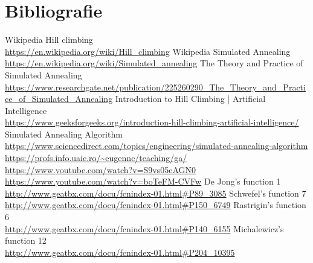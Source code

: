 \documentclass{article}
\begin{document}
\section{Bibliografie}
  Wikipedia Hill climbing
  \\ \url{https://en.wikipedia.org/wiki/Hill_climbing}
  Wikipedia Simulated Annealing
  \\ \url{https://en.wikipedia.org/wiki/Simulated_annealing}
  The Theory and Practice of Simulated Annealing
  \\ \url{https://www.researchgate.net/publication/225260290_The_Theory_and_Practice_of_Simulated_Annealing}
  Introduction to Hill Climbing | Artificial Intelligence
  \\ \url{https://www.geeksforgeeks.org/introduction-hill-climbing-artificial-intelligence/}
  Simulated Annealing Algorithm
  \\ \url{https://www.sciencedirect.com/topics/engineering/simulated-annealing-algorithm}
  \\ \url{https://profs.info.uaic.ro/~eugennc/teaching/ga/}
  \\ \url{https://www.youtube.com/watch?v=S9vs05eAGN0}
  \\ \url{https://www.youtube.com/watch?v=boTeFM-CVFw}
De Jong's function 1
  \\ \url{http://www.geatbx.com/docu/fcnindex-01.html#P89_3085}
Schwefel's function 7
  \\ \url{http://www.geatbx.com/docu/fcnindex-01.html#P150_6749}
Rastrigin's function 6
  \\ \url{http://www.geatbx.com/docu/fcnindex-01.html#P140_6155}
Michalewicz's function 12
  \\ \url{http://www.geatbx.com/docu/fcnindex-01.html#P204_10395}
\end{document}
